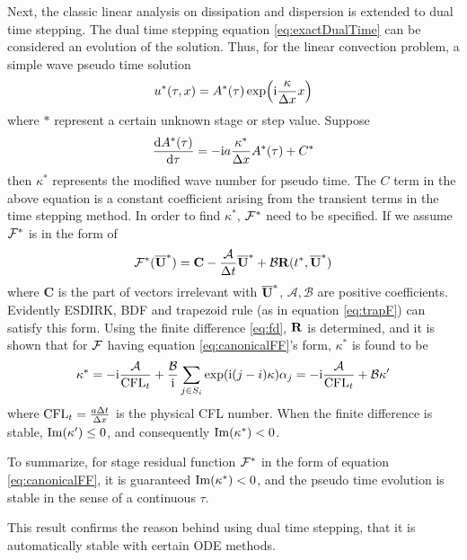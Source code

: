 \documentclass[preprint,12pt]{elsarticle}
\begin{document}
Next, the classic linear analysis on dissipation and dispersion is
extended to dual time stepping. The dual time
stepping equation \eqref{eq:exactDualTime} can be
considered an evolution of the solution.
Thus, for the linear convection problem,
a simple wave pseudo time solution
\begin{equation}
    u^*(\tau,x) = A^*(\tau)\exp(\mathrm{i} \frac{\kappa}{\mathrm\Delta x} x)
    \label{eq:simpleWaveTestTau}
\end{equation}
where $*$ represent a certain unknown stage or step value.
Suppose
\begin{equation}
    \frac{\dd A^*(\tau)}{\dd \tau} = -\mathrm{i} a\frac{\kappa^*}{\mathrm\Delta x}  A^*(\tau) + C^*
    \label{eq:kappaSDefTau}
\end{equation}
then $\kappa^*$ represents the modified wave number for pseudo time.
The $C$ term in the above equation is a constant coefficient arising
from the transient terms in the time stepping method.
In order to find $\kappa^*$, $\mathcal{F}^*$ need to be specified.
If we assume $\mathcal{F}^*$ is in the form of
\begin{equation}
    \mathcal{F}^*(\overline{\mathbf{U}}^*) = \mathbf{C} - \frac{\mathcal{A}}{\mathrm\Delta t} \overline{\mathbf{U}}^* + \mathcal{B}\mathbf{R}(t^*, \overline{\mathbf{U}}^*)
    \label{eq:canonicalFF}
\end{equation}
where $\mathbf{C}$ is the part of vectors irrelevant with $\overline{\mathbf{U}}^*$,
$\mathcal{A},\mathcal{B}$ are positive coefficients.
Evidently ESDIRK, BDF and trapezoid rule (as in equation \eqref{eq:trapF})
can satisfy this form.
Using the finite difference \eqref{eq:fd}, $\mathbf{R}$ is determined, and it is
shown that for $\mathcal{F}$ having equation \eqref{eq:canonicalFF}'s form,
$\kappa^*$ is found to be
\begin{equation}
    \kappa^* = -\mathrm{i}\frac{\mathcal{A}}{\text{CFL}_t} +
    \frac{\mathcal{B}}{\mathrm{i}} \sum_{j\in S_i}\exp(\mathrm{i} (j-i)\kappa)\alpha_j
    =-\mathrm{i}\frac{\mathcal{A}}{\text{CFL}_t} + \mathcal{B}\kappa'
\end{equation}
where $\text{CFL}_t = \frac{a\mathrm\Delta t }{\mathrm\Delta x}$ is the physical CFL number.
When the finite difference is stable, $\mathrm{Im} (\kappa') \leq 0$, and consequently
$\mathrm{Im} (\kappa^*) < 0$.

To summarize, for stage residual function $\mathcal{F}^*$ in the form of
equation \eqref{eq:canonicalFF}, it is guaranteed $\mathrm{Im} (\kappa^*) < 0$,
and the pseudo time evolution is stable in the sense of a continuous $\tau$.

This result confirms the reason behind using dual time stepping,
that it is automatically stable with certain ODE methods.
\end{document}
